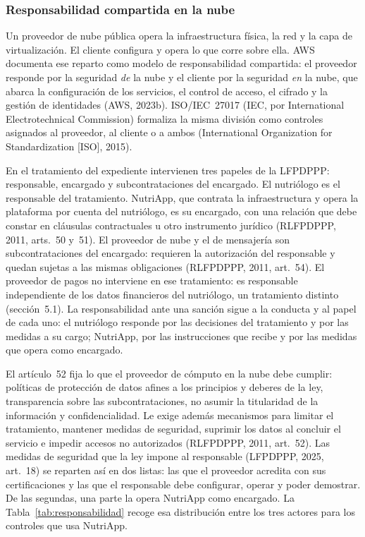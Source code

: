 \documentclass[12pt, a4paper]{article}
\begin{document}
\subsubsection{Responsabilidad compartida en la nube}
 
Un proveedor de nube pública opera la infraestructura física, la
red y la capa de virtualización. El cliente configura y opera lo
que corre sobre ella. AWS documenta ese reparto como modelo de
responsabilidad compartida: el proveedor responde por la seguridad
\textit{de} la nube y el cliente por la seguridad \textit{en} la
nube, que abarca la configuración de los servicios, el control de
acceso, el cifrado y la gestión de identidades (AWS, 2023b). ISO/IEC~27017 (IEC, por International Electrotechnical Commission) formaliza la misma división como
controles asignados al proveedor, al cliente o a ambos
(International Organization for Standardization [ISO], 2015).
 
En el tratamiento del expediente intervienen tres papeles de la
LFPDPPP: responsable, encargado y subcontrataciones del encargado. El
nutriólogo es el responsable del tratamiento. NutriApp, que
contrata la infraestructura y opera la plataforma por cuenta del
nutriólogo, es su encargado, con una relación que debe constar en
cláusulas contractuales u otro instrumento jurídico (RLFPDPPP,
2011, arts.~50 y~51). El proveedor de nube y el de mensajería son
subcontrataciones del encargado: requieren la autorización del
responsable y quedan sujetas a las mismas obligaciones (RLFPDPPP,
2011, art.~54). El proveedor de pagos no interviene en ese
tratamiento: es responsable independiente de los datos financieros
del nutriólogo, un tratamiento distinto (sección~5.1). La
responsabilidad ante una
sanción sigue a la conducta y al papel de cada uno: el nutriólogo
responde por las decisiones del tratamiento y por las medidas a su
cargo; NutriApp, por las instrucciones que recibe y por las
medidas que opera como encargado.
 
El artículo~52 fija lo que el proveedor de cómputo en la nube debe
cumplir: políticas de protección de datos afines a los principios
y deberes de la ley, transparencia sobre las subcontrataciones, no
asumir la titularidad de la información y confidencialidad. Le
exige además mecanismos para limitar el tratamiento, mantener
medidas de seguridad, suprimir los datos al concluir el servicio e
impedir accesos no autorizados (RLFPDPPP, 2011, art.~52). Las medidas de
seguridad que la ley impone al responsable (LFPDPPP, 2025, art.~18) se
reparten así en dos listas: las que el proveedor acredita con sus
certificaciones y las que el responsable debe configurar, operar y poder
demostrar. De las segundas, una parte la opera NutriApp como encargado.
La Tabla~\ref{tab:responsabilidad} recoge esa distribución entre los
tres actores para los controles que usa NutriApp.
 
\end{document}

